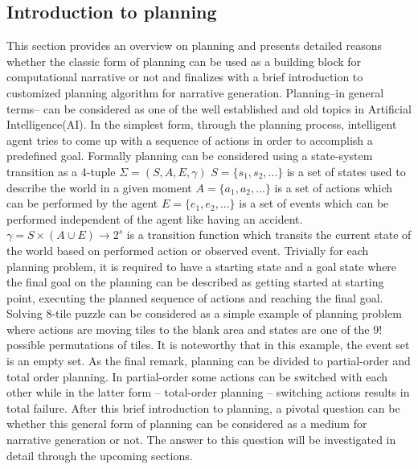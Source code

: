 \documentclass[english]{tktltiki}
\begin{document}
\subsection{Introduction to planning}
This section provides an overview on planning and presents detailed reasons whether the classic form of planning can be used as a building block for computational narrative or not and finalizes with a brief introduction to customized planning algorithm for narrative generation.\newline 
Planning--in general terms-- can be considered as one of the well established and old topics in Artificial Intelligence(AI). In the simplest form, through the planning process, intelligent agent tries to come up with a sequence of actions in order to accomplish a predefined goal. Formally planning can be considered using a state-system transition as a 4-tuple $\Sigma = (S,A,E,\gamma)$\newline
$S=\{s_1,s_2,...\}$ is a set of states used to describe the world in a given moment\newline
$A=\{a_1,a_2,...\}$ is a set of actions which can be performed by the agent\newline
$E=\{e_1,e_2,...\}$ is a set of events which can be performed independent of the agent like having an accident.\newline
$\gamma = S\times(A \cup E) \longrightarrow 2^s$ is a transition function which transits the current state of the world based on performed action or observed event. \newline
Trivially for each planning problem, it is required to have a starting state and a goal state where the final goal on the planning can be described as getting started at starting point, executing the planned sequence of actions and reaching the final goal.
Solving 8-tile puzzle can be considered as a simple example of planning problem where actions are moving tiles to the blank area and states are one of the $9!$ possible permutations of tiles. It is noteworthy that in this example, the event set is an empty set.
As the final remark, planning can be divided to partial-order and total order planning. In partial-order some actions can be switched with each other while in the latter form -- total-order planning -- switching actions results in total failure.
After this brief introduction to planning, a pivotal question can be whether this general form of planning can be considered as a medium for narrative generation or not. The answer to this question will be investigated in detail through the upcoming sections.
\end{document}
